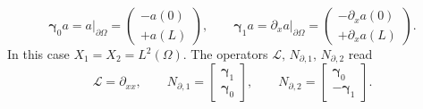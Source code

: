 \begin{equation}
	\bm\gamma_0 a = a\vert_{\partial\Omega} = \begin{pmatrix}
	-a(0) \\ +a(L)
	\end{pmatrix}, \qquad \bm\gamma_1 a = \partial_x a\vert_{\partial\Omega} = \begin{pmatrix}
	-\partial_x a(0) \\ +\partial_x a(L)
	\end{pmatrix}.
\end{equation}
In this case $X_1 = X_2 = L^2(\Omega)$. The operators $\mathcal{L}, \, N_{\partial, 1}, \, N_{\partial, 2}$ read
\begin{equation}
\mathcal{L} = \partial_{xx}, \qquad 
N_{\partial, 1} = \begin{bmatrix}
\bm\gamma_1 \\ \bm\gamma_0
\end{bmatrix}, \qquad 
N_{\partial, 2} = \begin{bmatrix}
\bm\gamma_0 \\ -\bm\gamma_1
\end{bmatrix}.
\end{equation}

